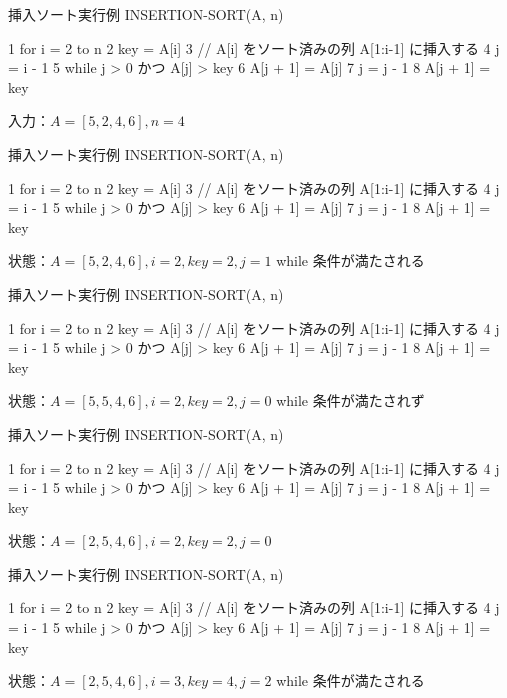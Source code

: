 \documentclass[unicode,11pt,aspectratio=169,hide notes]{beamer} %
\begin{document}
\begin{frame}[fragile]{挿入ソート}{実行例}
  INSERTION-SORT(A, n)
  \begin{semiverbatim}
1  for i = 2 to n
2    key = A[i]
3    // A[i] をソート済みの列 A[1:i-1] に挿入する
4    j = i - 1
5    while j > 0 かつ A[j] > key
6      A[j + 1] = A[j]
7      j = j - 1
8    A[j + 1] = key
  \end{semiverbatim}
  入力：$A = [5, 2, 4, 6], n = 4$
\end{frame}

\begin{frame}[fragile]{挿入ソート}{実行例}
  INSERTION-SORT(A, n)
  \begin{semiverbatim}
1  for i = 2 to n
2    key = A[i]
3    // A[i] をソート済みの列 A[1:i-1] に挿入する
4    j = i - 1
5    \alert{while j > 0 かつ A[j] > key}
6      A[j + 1] = A[j]
7      j = j - 1
8    A[j + 1] = key
  \end{semiverbatim}
  状態：$A = [5, 2, 4, 6], i = 2, key = 2, j = 1$ while 条件が満たされる
\end{frame}

\begin{frame}[fragile]{挿入ソート}{実行例}
  INSERTION-SORT(A, n)
  \begin{semiverbatim}
1  for i = 2 to n
2    key = A[i]
3    // A[i] をソート済みの列 A[1:i-1] に挿入する
4    j = i - 1
5    \alert{while j > 0 かつ A[j] > key}
6      A[j + 1] = A[j]
7      j = j - 1
8    A[j + 1] = key
  \end{semiverbatim}
  状態：$A = [5, 5, 4, 6], i = 2, key = 2, j = 0$ while 条件が満たされず
\end{frame}

\begin{frame}[fragile]{挿入ソート}{実行例}
  INSERTION-SORT(A, n)
  \begin{semiverbatim}
1  for i = 2 to n
2    key = A[i]
3    // A[i] をソート済みの列 A[1:i-1] に挿入する
4    j = i - 1
5    while j > 0 かつ A[j] > key
6      A[j + 1] = A[j]
7      j = j - 1
8    \alert{A[j + 1] = key}
  \end{semiverbatim}
  状態：$A = [2, 5, 4, 6], i = 2, key = 2, j = 0$
\end{frame}

\begin{frame}[fragile]{挿入ソート}{実行例}
  INSERTION-SORT(A, n)
  \begin{semiverbatim}
1  for i = 2 to n
2    key = A[i]
3    // A[i] をソート済みの列 A[1:i-1] に挿入する
4    j = i - 1
5    \alert{while j > 0 かつ A[j] > key}
6      A[j + 1] = A[j]
7      j = j - 1
8    A[j + 1] = key
  \end{semiverbatim}
  状態：$A = [2, 5, 4, 6], i = 3, key = 4, j = 2$ while 条件が満たされる
\end{frame}
\end{document}
